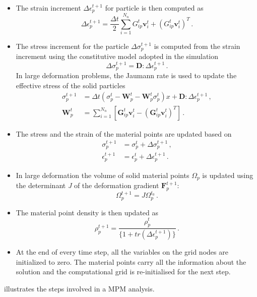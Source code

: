 \begin{itemize}
\item
The strain increment $\Delta \epsilon_{p}^{t+1}$ for particle is then computed 
as
%
\begin{equation}
\Delta \epsilon_{p}^{t+1} = \frac{\Delta t}{2} 
\sum\limits_{\mathit{i}=1}^{\mathit{N}_{n}}{{G}_{\mathit{ip}}^{t} 
\mathbf{v}_{\mathit{i}}^{t} + ({G}_{\mathit{ip}}^{t} 
\mathbf{v}_{\mathit{i}}^{t})^{\mathit{T}}} \,.
\end{equation}
\item
The stress increment for the particle $\Delta \sigma_{\mathit{p}}^{t+1}$ is 
computed from the strain increment using the constitutive model adopted in the 
simulation
%
\begin{equation}
\Delta \sigma_{\mathit{p}}^{t+1} = \mathbf{D} : \Delta \epsilon_{p}^{t+1} \,.
\end{equation}
%
In large deformation problems, the Jaumann rate is used to update the effective 
stress of the solid particles
\begin{align}
\sigma_p^{t+1} & = \Delta t \left( \sigma_p^t - \mathbf{W}_p^t - 
\mathbf{W}_p^t \sigma_p^t\right) x+ 
\mathbf{D} : \Delta \epsilon_{p}^{t+1} \,, \\
\mathbf{W}_p^t & = \sum\limits_{i = 1}^{N_n}\left[ \mathbf{G}_{ip}^t 
\textbf{v}_i^t -  \left(\mathbf{G}_{ip}^t \textbf{v}_i^t\right)^T\right]  \,.
\end{align}
\item
The stress and the strain of the material points are updated based on
%
\begin{align}
\nonumber
\sigma_{\mathit{p}}^{t+1} & = \sigma_{\mathit{p}}^{t} + \Delta 
\sigma_{\mathit{p}}^{t+1} \,, \\
\epsilon_{p}^{t+1} & =\epsilon_{p}^{t} + \Delta \epsilon_{p}^{t+1} \,.
\end{align}
%

\item
In large deformation the volume of solid material points $\Omega_p$ is updated 
using the determinant \textit{J} of the deformation gradient 
$\mathbf{F}_p^{t+1}$:
\begin{equation}
\Omega_p^{t+1} = J \Omega_p^{t_0} \,.
\end{equation}

\item
The material point density is then updated as
%
\begin{equation}
\rho_{p}^{t+1}=\frac{\rho_{p}^{t}}{\{1+tr(\Delta \epsilon_{p}^{t+1})\}} \,.
\end{equation}
%

\item
At the end of every time step, all the variables on the grid nodes are 
initialized to zero. The material points carry all the information about the
solution and the computational grid is re-initialised for the next step.
\end{itemize}
 illustrates the steps involved in a MPM analysis. 

